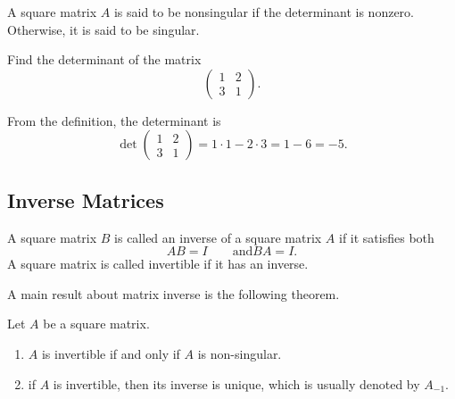 A square matrix $A$ is said to be nonsingular if the determinant is nonzero. Otherwise, it is said to be singular.

\begin{example}
  Find the determinant of the matrix
  \[\begin{pmatrix}
    1 & 2 \\
    3 & 1
  \end{pmatrix}.\]
\end{example}
\begin{solution}
  From the definition, the determinant is
  \[
  \det\begin{pmatrix}
    1 & 2 \\
    3 & 1
  \end{pmatrix} = 1\cdot 1 - 2\cdot 3=1-6=-5. 
  \]
\end{solution}

\subsection*{Inverse Matrices}

A square matrix $B$ is called an inverse of a square matrix $A$ if it satisfies both
\[AB=I \qquad\text{and} BA=I.\]
A square matrix is called invertible if it has an inverse.

A main result about matrix inverse is the following theorem.
\begin{theorem}
  Let $A$ be a square matrix.
  \begin{enumerate}
    \item $A$ is invertible if and only if $A$ is non-singular.
    \item if $A$ is invertible, then its inverse is unique, which is usually denoted by $A_{-1}$.
  \end{enumerate}
\end{theorem}

